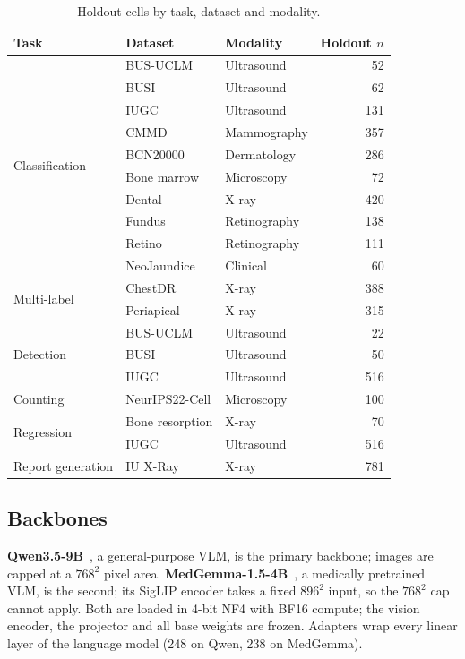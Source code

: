 \documentclass[journal,twoside,web]{ieeecolor}
\begin{document}
\begin{table}[!t]
\caption{Holdout cells by task, dataset and modality.}
\label{tab:data}
\centering
\setlength{\tabcolsep}{3pt}
\begin{tabular}{lllr}
\toprule
Task & Dataset & Modality & Holdout $n$ \\
\midrule
\multirow{10}{*}{Classification}
 & BUS-UCLM & Ultrasound & 52 \\
 & BUSI & Ultrasound & 62 \\
 & IUGC & Ultrasound & 131 \\
 & CMMD & Mammography & 357 \\
 & BCN20000 & Dermatology & 286 \\
 & Bone marrow & Microscopy & 72 \\
 & Dental & X-ray & 420 \\
 & Fundus & Retinography & 138 \\
 & Retino & Retinography & 111 \\
 & NeoJaundice & Clinical & 60 \\
\midrule
\multirow{2}{*}{Multi-label}
 & ChestDR & X-ray & 388 \\
 & Periapical & X-ray & 315 \\
\midrule
\multirow{3}{*}{Detection}
 & BUS-UCLM & Ultrasound & 22 \\
 & BUSI & Ultrasound & 50 \\
 & IUGC & Ultrasound & 516 \\
\midrule
Counting & NeurIPS22-Cell & Microscopy & 100 \\
\midrule
\multirow{2}{*}{Regression}
 & Bone resorption & X-ray & 70 \\
 & IUGC & Ultrasound & 516 \\
\midrule
Report generation & IU X-Ray & X-ray & 781 \\
\bottomrule
\end{tabular}
\end{table}

\subsection{Backbones}

\textbf{Qwen3.5-9B}~\cite{qwen2026qwen35}, a general-purpose VLM, is the
primary backbone; images are capped at a $768^2$ pixel area.
\textbf{MedGemma-1.5-4B}~\cite{sellergren2025medgemma}, a medically
pretrained VLM, is the second; its SigLIP encoder takes a fixed $896^2$
input, so the $768^2$ cap cannot apply. Both are loaded in 4-bit NF4 with
BF16 compute; the vision encoder, the projector and all base weights are
frozen. Adapters wrap every linear layer of the language model (248 on
Qwen, 238 on MedGemma).
\end{document}
